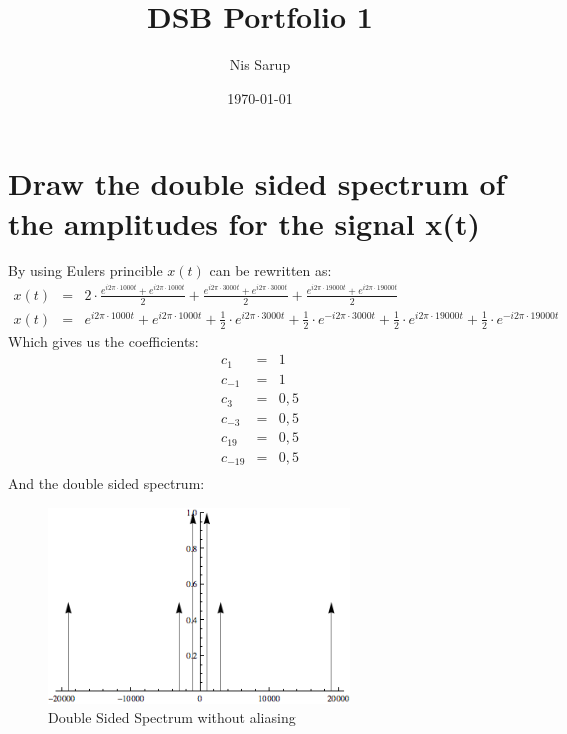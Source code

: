 \documentclass[a4wide,10pt]{article}
\begin{document}
\title{DSB Portfolio 1}
\author{Nis Sarup}
\date{\today}
\maketitle

\section{Draw the double sided spectrum of the amplitudes for the signal x(t)} %
\label{sec:draw_the_double_sided_spectrum_of_the_amplitudes_for_the_signal_x_t_}
By using Eulers princible $x(t)$ can be rewritten as:
\begin{eqnarray}
	x(t)&=&2\cdot \frac{e^{i2\pi \cdot 1000t}+e^{i2\pi \cdot 1000t}}{2}+\frac{e^{i2\pi \cdot 3000t}+e^{i2\pi \cdot 3000t}}{2}+\frac{e^{i2\pi \cdot 19000t}+e^{i2\pi \cdot 19000t}}{2} \nonumber \\
	x(t)&=&e^{i2\pi \cdot 1000t}+e^{i2\pi \cdot 1000t}+\frac{1}{2} \cdot e^{i2\pi \cdot 3000t}+\frac{1}{2} \cdot e^{-i2\pi \cdot 3000t}+\frac{1}{2} \cdot e^{i2\pi \cdot 19000t}+\frac{1}{2} \cdot e^{-i2\pi \cdot 19000t}
\end{eqnarray}
Which gives us the coefficients:
\begin{eqnarray}
	c_1&=&1 \nonumber \\
	c_{-1}&=&1 \nonumber \\
	c_3&=&0,5 \nonumber \\
	c_{-3}&=&0,5 \nonumber \\
	c_{19}&=&0,5 \nonumber \\
	c_{-19}&=&0,5 \nonumber \\
\end{eqnarray}
And the double sided spectrum:
\begin{figure}[htbp]
	\centering
		\includegraphics[width=8cm]{images/double-sided-spectrum-1.png}
	\caption{Double Sided Spectrum without aliasing}
	\label{fig:images_double-sided-spectrum-1}
\end{figure}
\end{document}
